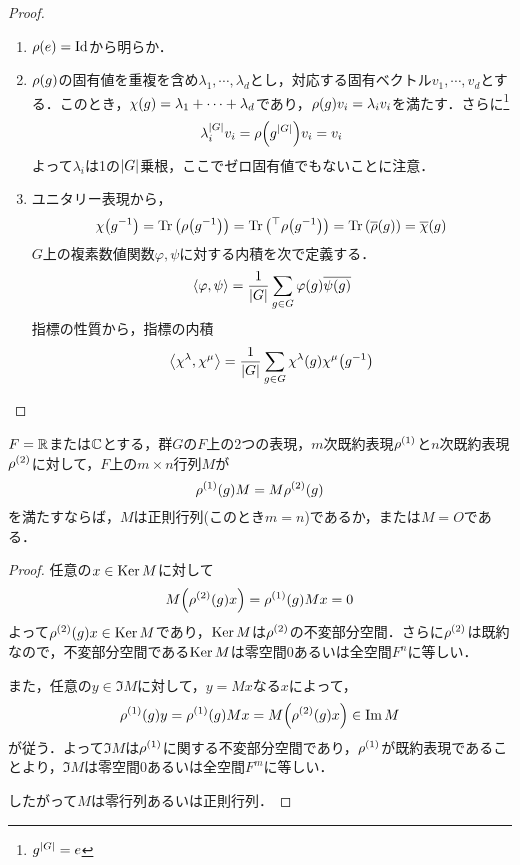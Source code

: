 \documentclass[main]{subfiles}
\begin{document}
	\begin{proof}
		\begin{enumerate}
			\item $\rho\qty(e)=\text{Id}$から明らか．
			\item $\rho\qty(g)$の固有値を重複を含め$\lambda_1,\cdots,\lambda_d$とし，対応する固有ベクトル$v_1,\cdots,v_d$とする．このとき，$\chi\qty(g)=\lambda_1+\cdots+\lambda_d$であり，$\rho\qty(g)v_i=\lambda_iv_i$を満たす．さらに\footnote{$g^\qty|G|=e$}\[\lambda_i^\qty|G|v_i=\rho\qty(g^\qty|G|)v_i=v_i\]よって$\lambda_i$は1の$\qty|G|$乗根，ここでゼロ固有値でもないことに注意．
			\item ユニタリー表現から，\[\chi\qty(g^{-1})=\Tr\qty(\rho\qty(g^{-1}))=\Tr\qty(^{\top}\rho\qty(g^{-1}))=\Tr\qty(\overline{\rho}\qty(g))=\overline{\chi}\qty(g)\]$G$上の複素数値関数$\varphi,\psi$に対する内積を次で定義する．\[\left<\varphi,\psi\right>=\frac{1}{\qty|G|}\sum_{g\in G}\varphi\qty(g)\overline{\psi\qty(g)}\]指標の性質から，指標の内積\[\left<\chi^\lambda,\chi^\mu\right>=\frac{1}{\qty|G|}\sum_{g\in G}\chi^\lambda\qty(g)\chi^\mu\qty(g^{-1})\]
		\end{enumerate}
	\end{proof}
	\begin{lem}[Schurの補題1]
		$F=\mathbb{R}$または$\mathbb{C}$とする，群$G$の$F$上の2つの表現，$m$次既約表現$\rho^\qty(1)$と$n$次既約表現$\rho^\qty(2)$に対して，$F$上の$m\times n$行列$M$が
		\[\rho^\qty(1)\qty(g)M=M\rho^\qty(2)\qty(g)\]
		を満たすならば，$M$は正則行列(このとき$m=n$)であるか，または$M=O$である．
	\end{lem}
	\begin{proof}
		任意の$x\in\operatorname{Ker} M$に対して
		\[M\qty(\rho^\qty(2)\qty(g)x)=\rho^\qty(1)\qty(g)Mx=0\]
		よって$\rho^\qty(2)\qty(g)x\in\operatorname{Ker} M$であり，$\operatorname{Ker} M$は$\rho^\qty(2)$の不変部分空間．さらに$\rho^\qty(2)$は既約なので，不変部分空間である$\operatorname{Ker} M$は零空間$\qty{0}$あるいは全空間$F^n$に等しい．

		また，任意の$y\in\Im M$に対して，$y=Mx$なる$x$によって，
		\[\rho^\qty(1)\qty(g)y=\rho^\qty(1)\qty(g)Mx=M\qty(\rho^\qty(2)\qty(g)x)\in\Im M\]
		が従う．よって$\Im M$は$\rho^\qty(1)$に関する不変部分空間であり，$\rho^\qty(1)$が既約表現であることより，$\Im M$は零空間$\qty{0}$あるいは全空間$F^m$に等しい．

		したがって$M$は零行列あるいは正則行列．
	\end{proof}
\end{document}
